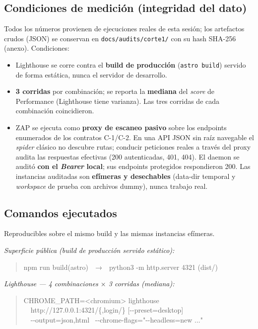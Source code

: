 \documentclass[11pt]{article}
\begin{document}
\subsection{Condiciones de medición (integridad del dato)}
Todos los números provienen de ejecuciones reales de esta sesión; los artefactos
crudos (JSON) se conservan en \texttt{docs/audits/corte1/} con su hash SHA-256
(anexo). Condiciones:
\begin{itemize}[leftmargin=1.2em,itemsep=1pt]
  \item Lighthouse se corre contra el \textbf{build de producción} (\texttt{astro build})
        servido de forma estática, nunca el servidor de desarrollo.
  \item \textbf{3 corridas} por combinación; se reporta la \textbf{mediana} del
        \emph{score} de Performance (Lighthouse tiene varianza). Las tres corridas
        de cada combinación coincidieron.
  \item ZAP se ejecuta como \textbf{proxy de escaneo pasivo} sobre los endpoints
        enumerados de los contratos C-1/C-2. En una API JSON sin raíz navegable el
        \emph{spider} clásico no descubre rutas; conducir peticiones reales a través
        del proxy audita las respuestas efectivas (200 autenticadas, 401, 404). El
        daemon se auditó \textbf{con el \emph{Bearer} local}; sus endpoints
        protegidos respondieron 200. Las instancias auditadas son \textbf{efímeras y
        desechables} (data-dir temporal y \emph{workspace} de prueba con archivos
        dummy), nunca trabajo real.
\end{itemize}

\subsection{Comandos ejecutados}
Reproducibles sobre el mismo build y las mismas instancias efímeras.

\medskip
\noindent\textit{Superficie pública (build de producción servido estático):}
\begin{quote}\ttfamily\scriptsize\raggedright
npm run build\quad(astro)\ \ →\ \ python3 -m http.server 4321 (dist/)
\end{quote}

\noindent\textit{Lighthouse — 4 combinaciones $\times$ 3 corridas (mediana):}
\begin{quote}\ttfamily\scriptsize\raggedright
CHROME\_PATH=<chromium> lighthouse \\
\ \ http://127.0.0.1:4321/\{,login/\} [-{}-preset=desktop] \\
\ \ -{}-output=json,html \ -{}-chrome-flags="-{}-headless=new ..."
\end{quote}
\end{document}
